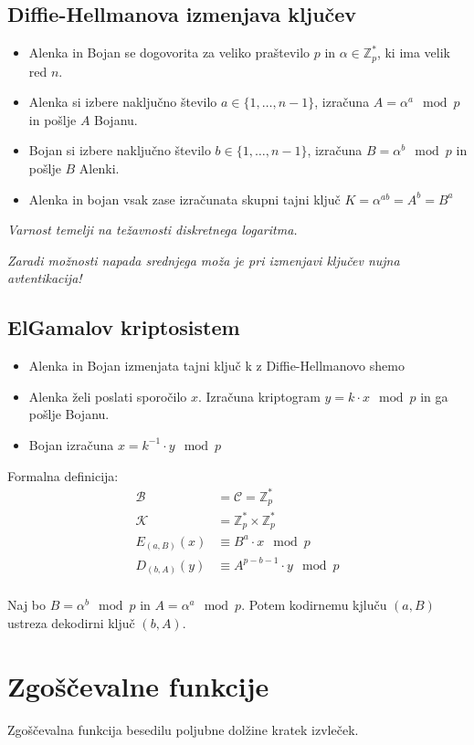 \begin{multicols}{5}
\subsection*{Diffie-Hellmanova izmenjava ključev}
\begin{itemize}
	\item Alenka in Bojan se dogovorita za veliko praštevilo $p$ in $\alpha \in \mathbb{Z}_p^*$, ki ima velik red $n$.
	\item Alenka si izbere naključno število $a \in \{1, \dots, n-1\}$,
	izračuna $A = \alpha^a \mod p$ in pošlje $A$ Bojanu.
	\item Bojan si izbere naključno število $b \in \{1, \dots, n-1\}$, 
	izračuna $B = \alpha^b \mod p$ in pošlje $B$ Alenki.
	\item Alenka in bojan vsak zase izračunata skupni tajni ključ $K = \alpha^{ab} = A^b = B^a$
\end{itemize}
\textit{Varnost temelji na težavnosti diskretnega logaritma.}

\textit{Zaradi možnosti napada srednjega moža je pri izmenjavi ključev nujna avtentikacija!}

\subsection*{ElGamalov kriptosistem}
\begin{itemize}
	\item Alenka in Bojan izmenjata tajni ključ k z Diffie-Hellmanovo shemo
	\item Alenka želi poslati sporočilo $x$. Izračuna kriptogram $y = k\cdot x \mod p$ in ga pošlje Bojanu.
	\item Bojan izračuna $x = k^{-1} \cdot y \mod p$
\end{itemize}
Formalna definicija:
\begin{align*}
	\mathcal{B} &= \mathcal{C} = \mathbb{Z}_p^* \\
	\mathcal{K} &= \mathbb{Z}_p^* \times \mathbb{Z}_p^* \\
	E_{(a,B)}(x) &\equiv B^a \cdot x \mod p \\
	D_{(b,A)}(y) &\equiv A^{p-b-1} \cdot y \mod p \\
\end{align*}

Naj bo $B = \alpha^b \mod p$ in $A = \alpha^a \mod p$. Potem kodirnemu kjluču $(a, B)$ ustreza dekodirni ključ $(b, A)$.

\section*{Zgoščevalne funkcije}
Zgoščevalna funkcija besedilu poljubne dolžine kratek izvleček.


\end{multicols}
